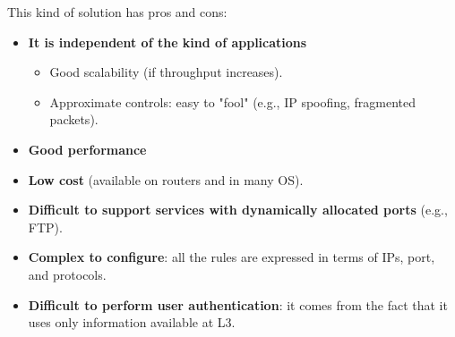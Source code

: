 This kind of solution has pros and cons:

\begin{itemize}
	\item \textbf{It is independent of the kind of applications}
	      \begin{itemize}
		      \item Good scalability (if throughput increases).
		      \item Approximate controls: easy to "fool" (e.g., IP spoofing, fragmented packets).
	      \end{itemize}
	\item \textbf{Good performance}
	\item \textbf{Low cost} (available on routers and in many OS).
	\item \textbf{Difficult to support services with dynamically allocated ports} (e.g., FTP).
	\item \textbf{Complex to configure}: all the rules are expressed in terms of IPs, port, and protocols.
	\item \textbf{Difficult to perform user authentication}: it comes from the fact that it uses only information available at L3.
\end{itemize}




